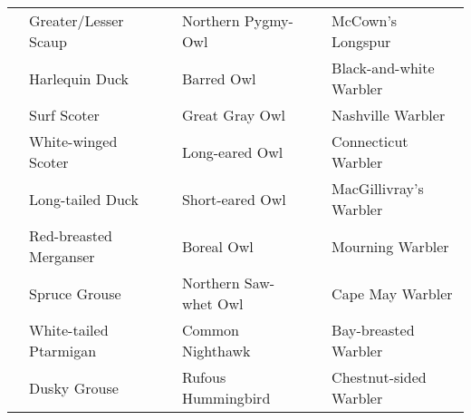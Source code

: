 \documentclass{article}
\begin{document}
\begin{center}
\begin{tabularx}{\textwidth}{cXcXcX}
\underline{\hspace{3ex}} 	 &Greater/Lesser Scaup 	 &\underline{\hspace{3ex}} 	 &Northern Pygmy-Owl 	 &\underline{\hspace{3ex}} 	 &McCown's Longspur \\ 
\underline{\hspace{3ex}} 	 &Harlequin Duck 	 &\underline{\hspace{3ex}} 	 &Barred Owl 	 &\underline{\hspace{3ex}} 	 &Black-and-white Warbler \\ 
\underline{\hspace{3ex}} 	 &Surf Scoter 	 &\underline{\hspace{3ex}} 	 &Great Gray Owl 	 &\underline{\hspace{3ex}} 	 &Nashville Warbler \\ 
\underline{\hspace{3ex}} 	 &White-winged Scoter 	 &\underline{\hspace{3ex}} 	 &Long-eared Owl 	 &\underline{\hspace{3ex}} 	 &Connecticut Warbler \\ 
\underline{\hspace{3ex}} 	 &Long-tailed Duck 	 &\underline{\hspace{3ex}} 	 &Short-eared Owl 	 &\underline{\hspace{3ex}} 	 &MacGillivray's Warbler \\ 
\underline{\hspace{3ex}} 	 &Red-breasted Merganser 	 &\underline{\hspace{3ex}} 	 &Boreal Owl 	 &\underline{\hspace{3ex}} 	 &Mourning Warbler \\ 
\underline{\hspace{3ex}} 	 &Spruce Grouse 	 &\underline{\hspace{3ex}} 	 &Northern Saw-whet Owl 	 &\underline{\hspace{3ex}} 	 &Cape May Warbler \\ 
\underline{\hspace{3ex}} 	 &White-tailed Ptarmigan 	 &\underline{\hspace{3ex}} 	 &Common Nighthawk 	 &\underline{\hspace{3ex}} 	 &Bay-breasted Warbler \\ 
\underline{\hspace{3ex}} 	 &Dusky Grouse 	 &\underline{\hspace{3ex}} 	 &Rufous Hummingbird 	 &\underline{\hspace{3ex}} 	 &Chestnut-sided Warbler \\ 

\end{tabularx}
\end{center}
\end{document}
